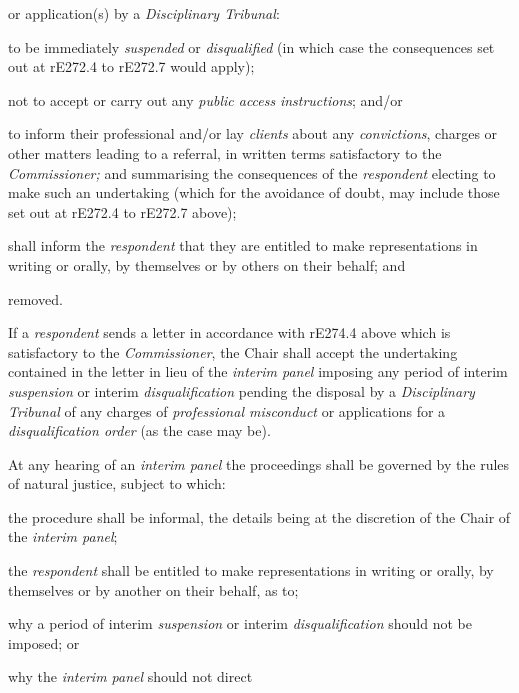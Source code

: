 or application(s) by a \emph{Disciplinary Tribunal}:
\al \item to be immediately \emph{suspended} or \emph{disqualified} (in which
case the consequences set out at rE272.4 to rE272.7 would apply);\\
\item not to accept or carry out any \emph{public
access} \emph{instructions}; and/or\\
\item to inform their professional and/or lay \emph{clients} about
any \emph{convictions}, charges or other matters leading to a referral,
in written terms satisfactory to the \emph{Commissioner;}\la
and summarising the consequences of the \emph{respondent} electing to
make such an undertaking (which for the avoidance of doubt, may include
those set out at rE272.4 to rE272.7 above);\item shall inform the \emph{respondent} that they are entitled to make
representations in writing or orally, by themselves or by others on
their behalf; and\item removed.\ln
{}\par
If a \emph{respondent} sends a letter in accordance with rE274.4 above
which is satisfactory to the \emph{Commissioner}, the Chair shall accept
the undertaking contained in the letter in lieu of the \emph{interim
panel }imposing any period of interim \emph{suspension} or
interim \emph{disqualification} pending the disposal by
a \emph{Disciplinary Tribunal} of any charges of \emph{professional
misconduct} or applications for a \emph{disqualification order} (as the
case may be).\\
\par
{}
At any hearing of an \emph{interim panel} the proceedings shall be
governed by the rules of natural justice, subject to which:\\\nl \item the procedure shall be informal, the details being at the discretion
of the Chair of the \emph{interim panel};\item the \emph{respondent} shall be entitled to make representations in
writing or orally, by themselves or by another on their behalf, as to;\al
\item why a period of interim \emph{suspension} or
interim \emph{disqualification} should not be imposed; or\\
\item  why the \emph{interim panel} should not direct

